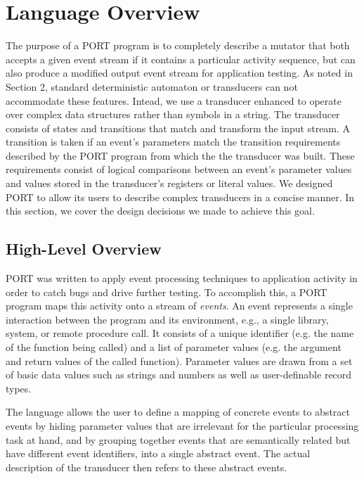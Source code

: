 \section{Language Overview}
\label{sec:Overview}

The purpose
of a PORT program is to completely describe a mutator
that both
accepts a given event stream if it contains a particular
activity sequence, but can also produce a modified
output event stream
for application testing.
As noted in Section 2, standard
deterministic automaton or transducers can not accommodate these features.
Intead, we use
a transducer enhanced to operate over complex data structures
rather than symbols in a string.
The transducer consists of states and transitions that match and transform the input stream.
A transition is taken if an event's parameters match the transition requirements described
by the PORT program from which the the transducer was built.
These requirements consist of logical comparisons between an event's parameter values
and values stored in the transducer's registers or literal values.
We designed PORT to allow its users to
describe complex transducers in a concise manner.
In this section, we cover the design decisions we made
to achieve this goal.

\subsection{High-Level Overview}
\label{sub:ProcessingEventStreams}
PORT was written to apply event processing techniques to application activity in order to catch bugs and drive further testing.
To accomplish this, a PORT program maps this activity onto a
stream of \emph{events}. An event represents a single interaction between the program and its environment, e.g.,
a single library, system, or remote procedure call.
It consists of a unique identifier (e.g. the name of the function being called) and a list of parameter values (e.g. the argument and return values of the called function).
Parameter values are drawn from a set of basic data values such as strings and numbers as well as user-definable record types.

The language allows the user to define a mapping of concrete events to abstract events by hiding parameter values that are irrelevant for the particular processing task at hand, and by grouping together events that are semantically related but have different event identifiers, into a single abstract event.
The actual description of the transducer then refers to these abstract events.

